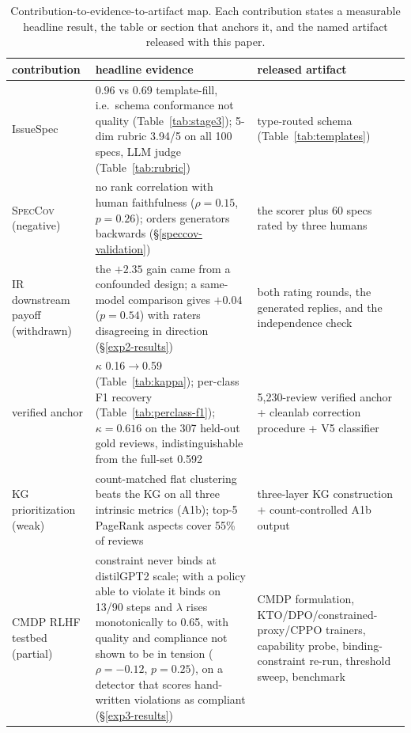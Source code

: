 \documentclass[preprint,12pt]{elsarticle}
\begin{document}
\begin{table}[!htbp]\centering\footnotesize
\caption{Contribution-to-evidence-to-artifact map. Each contribution states a measurable headline result, the table or section that anchors it, and the named artifact released with this paper.}\label{tab:c2evidence}
\setlength{\tabcolsep}{4pt}\renewcommand{\arraystretch}{1.15}
\begin{tabularx}{\textwidth}{@{}p{2.4cm}LL@{}}\toprule
contribution & headline evidence & released artifact \\\midrule
IssueSpec & 0.96 vs 0.69 template-fill, i.e.\ schema conformance not quality (Table~\ref{tab:stage3}); 5-dim rubric 3.94/5 on all 100 specs, LLM judge (Table~\ref{tab:rubric}) & type-routed schema (Table~\ref{tab:templates}) \\
\textsc{SpecCov} (negative) & no rank correlation with human faithfulness ($\rho=0.15$, $p=0.26$); orders generators backwards (\S\ref{speccov-validation}) & the scorer plus 60 specs rated by three humans \\
IR downstream payoff (withdrawn) & the $+2.35$ gain came from a confounded design; a same-model comparison gives $+0.04$ ($p=0.54$) with raters disagreeing in direction (\S\ref{exp2-results}) & both rating rounds, the generated replies, and the independence check \\
verified anchor & $\kappa$ 0.16$\to$0.59 (Table~\ref{tab:kappa}); per-class F1 recovery
  (Table~\ref{tab:perclass-f1}); $\kappa = 0.616$ on the 307 held-out gold reviews, indistinguishable from the full-set 0.592 & 5{,}230-review
  verified anchor + cleanlab correction procedure + V5 classifier \\
KG prioritization (weak) & count-matched flat clustering beats the KG on all three intrinsic metrics (A1b); top-5 PageRank aspects cover 55\% of reviews & three-layer KG construction + count-controlled A1b output \\
CMDP RLHF testbed (partial) & constraint never binds at distilGPT2 scale; with a policy able to
  violate it binds on 13/90 steps and $\lambda$ rises monotonically to 0.65, with quality and
  compliance not shown to be in tension ($\rho = -0.12$, $p = 0.25$), on a detector that scores
  hand-written violations as compliant
  (\S\ref{exp3-results}) & CMDP formulation, KTO/DPO/constrained-proxy/CPPO trainers, capability
  probe, binding-constraint re-run, threshold sweep, benchmark \\
\bottomrule\end{tabularx}\end{table}
\end{document}
